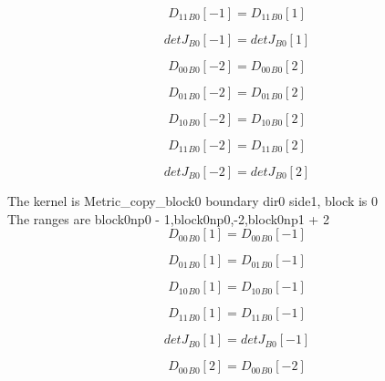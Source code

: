 \documentclass{article}
\begin{document}
\begin{dmath}{D_{11}{_{B0}}}[{-1}] = {D_{11}{_{B0}}}[{1}]\end{dmath}

\begin{dmath}{detJ{_{B0}}}[{-1}] = {detJ{_{B0}}}[{1}]\end{dmath}

\begin{dmath}{D_{00}{_{B0}}}[{-2}] = {D_{00}{_{B0}}}[{2}]\end{dmath}

\begin{dmath}{D_{01}{_{B0}}}[{-2}] = {D_{01}{_{B0}}}[{2}]\end{dmath}

\begin{dmath}{D_{10}{_{B0}}}[{-2}] = {D_{10}{_{B0}}}[{2}]\end{dmath}

\begin{dmath}{D_{11}{_{B0}}}[{-2}] = {D_{11}{_{B0}}}[{2}]\end{dmath}

\begin{dmath}{detJ{_{B0}}}[{-2}] = {detJ{_{B0}}}[{2}]\end{dmath}

\noindent The kernel is Metric_copy_block0 boundary dir0 side1, block is 0\\\noindent The ranges are block0np0 - 1,block0np0,-2,block0np1 + 2\\\begin{dmath}{D_{00}{_{B0}}}[{1}] = {D_{00}{_{B0}}}[{-1}]\end{dmath}

\begin{dmath}{D_{01}{_{B0}}}[{1}] = {D_{01}{_{B0}}}[{-1}]\end{dmath}

\begin{dmath}{D_{10}{_{B0}}}[{1}] = {D_{10}{_{B0}}}[{-1}]\end{dmath}

\begin{dmath}{D_{11}{_{B0}}}[{1}] = {D_{11}{_{B0}}}[{-1}]\end{dmath}

\begin{dmath}{detJ{_{B0}}}[{1}] = {detJ{_{B0}}}[{-1}]\end{dmath}

\begin{dmath}{D_{00}{_{B0}}}[{2}] = {D_{00}{_{B0}}}[{-2}]\end{dmath}
\end{document}
